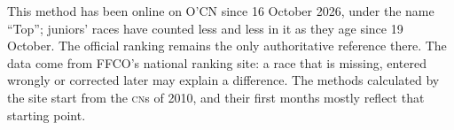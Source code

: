 \documentclass[11pt,a4paper]{article}
\newcommand{\CN}{\textsc{cn}}
\begin{document}
This method has been online on O'CN since 16 October 2026, under the name ``Top''; juniors' races have counted less and less in it as they age since 19 October. The official ranking remains the only authoritative reference there. The data come from FFCO's national ranking site: a race that is missing, entered wrongly or corrected later may explain a difference. The methods calculated by the site start from the \CN s of 2010, and their first months mostly reflect that starting point.
\end{document}
